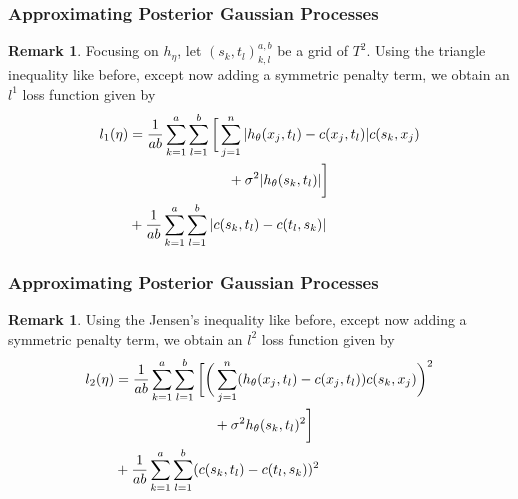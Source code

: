 \documentclass[notheorems]{beamer}
\theoremstyle{definition}
\newtheorem{rem}[definition]{Remark}
\newcommand{\sig}{\sigma}
\begin{document}
\begin{frame}
\frametitle{Approximating Posterior Gaussian Processes}
\begin{rem}
Focusing on $h_{\eta}$, let $(s_k, t_l)_{k,l}^{a,b}$ be a grid of $T^2$. Using the triangle inequality like before, except now adding a symmetric penalty term, we obtain an $l^1$ loss function given by
\begin{align*}
        l_1(\eta) 
    &= \frac{1}{ab} \sum\limits_{k=1}^a \sum\limits_{l=1}^b  \bigg [ \sum\limits_{j=1}^n |h_{\theta}(x_j, t_l) - c(x_j, t_l)| c(s_k, x_j)   \\
    & \hspace{2.5cm} + \sig^{2}  |h_{\theta}(s_k, t_l)| \bigg] \\
    &  + \frac{1}{ab} \sum\limits_{k=1}^a \sum\limits_{l=1}^b |c(s_k, t_l) - c(t_l, s_k)|
    \end{align*}
\end{rem}

\end{frame}














\begin{frame}
\frametitle{Approximating Posterior Gaussian Processes}
\begin{rem}
Using the Jensen's inequality like before, except now adding a symmetric penalty term, we obtain an $l^2$  loss function given by
\begin{align*}
        l_2(\eta) 
        &= \frac{1}{ab} \sum\limits_{k=1}^a \sum\limits_{l=1}^b  \bigg [ \bigg(\sum\limits_{j=1}^n (h_{\theta}(x_j, t_l) - c(x_j, t_l)) c(s_k, x_j) \bigg)^2   \\
    & \hspace{2.5cm} + \sig^{2}  h_{\theta}(s_k, t_l)^2 \bigg] \\
        &+ \frac{1}{ab} \sum\limits_{k=1}^a \sum\limits_{l=1}^b (c(s_k, t_l) - c(t_l, s_k))^2
    \end{align*}
\end{rem}

\end{frame}
\end{document}
